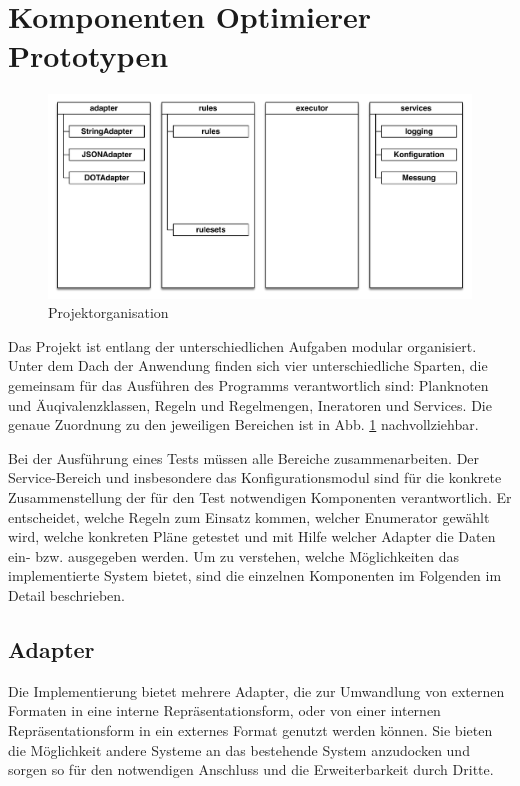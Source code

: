 \section{Komponenten Optimierer Prototypen}




\begin{figure}[ht]
  \centering
  \includegraphics[width=\textwidth]{04_Implementierung/00_media/Organization.pdf}
  \caption{Projektorganisation}
  \label{ProjectOrga}
\end{figure}


Das Projekt ist entlang der unterschiedlichen Aufgaben modular organisiert. Unter dem Dach der Anwendung finden sich vier unterschiedliche Sparten, die gemeinsam für das Ausführen des Programms verantwortlich sind: Planknoten und Äuqivalenzklassen, Regeln und Regelmengen, Ineratoren und Services. Die genaue Zuordnung zu den jeweiligen Bereichen ist in Abb. \ref{ProjectOrga} nachvollziehbar.




Bei der Ausführung eines Tests  müssen alle Bereiche zusammenarbeiten. Der Service-Bereich und insbesondere das Konfigurationsmodul sind für die konkrete Zusammenstellung der für den Test notwendigen Komponenten verantwortlich. Er entscheidet, welche Regeln zum Einsatz kommen, welcher Enumerator gewählt wird, welche konkreten Pläne getestet und mit Hilfe welcher Adapter die Daten ein-  bzw. ausgegeben werden. Um zu verstehen, welche Möglichkeiten das implementierte System bietet, sind die einzelnen Komponenten im Folgenden im Detail beschrieben.




\subsection{Adapter}

Die Implementierung bietet mehrere Adapter, die zur Umwandlung von externen Formaten in eine interne Repräsentationsform, oder von einer internen Repräsentationsform in ein externes Format genutzt werden können. Sie bieten die Möglichkeit andere Systeme an das bestehende System anzudocken und sorgen so für den notwendigen Anschluss und die Erweiterbarkeit durch Dritte.

